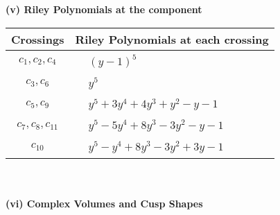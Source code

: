 \documentclass[1p]{elsarticle_modified}
\theoremstyle{definition}
\begin{document}
\newpage\renewcommand{\arraystretch}{1}
\flushleft \textbf{(v) Riley Polynomials at the component}\newline \\
\begin{tabular}{m{50pt}|m{274pt}}
Crossings & \hspace{64pt}Riley Polynomials at each crossing \\
\hline $$\begin{aligned}c_{1},c_{2},c_{4}\end{aligned}$$&$\begin{aligned}
&(y-1)^5
\end{aligned}$\\
\hline $$\begin{aligned}c_{3},c_{6}\end{aligned}$$&$\begin{aligned}
&y^5
\end{aligned}$\\
\hline $$\begin{aligned}c_{5},c_{9}\end{aligned}$$&$\begin{aligned}
&y^5+3 y^4+4 y^3+y^2- y-1
\end{aligned}$\\
\hline $$\begin{aligned}c_{7},c_{8},c_{11}\end{aligned}$$&$\begin{aligned}
&y^5-5 y^4+8 y^3-3 y^2- y-1
\end{aligned}$\\
\hline $$\begin{aligned}c_{10}\end{aligned}$$&$\begin{aligned}
&y^5- y^4+8 y^3-3 y^2+3 y-1
\end{aligned}$\\
\hline
\end{tabular}\\~\\
\newpage\flushleft \textbf{(vi) Complex Volumes and Cusp Shapes}
\end{document}
